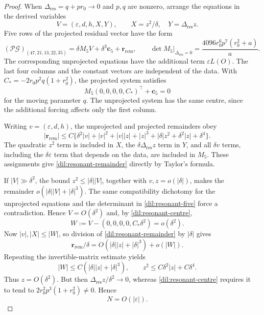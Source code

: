 \documentclass[11pt,a4paper]{article}
\numberwithin{equation}{section}
\theoremstyle{plain}
\theoremstyle{definition}
\theoremstyle{remark}
\begin{document}
\begin{proof}
When $\Delta_{\mathrm{res}}=q+pr_0\to0$ and $p,q$ are nonzero, arrange the equations in the derived variables
\[
 V=(\varepsilon,d,h,X,Y),\qquad
 X=z^2/\delta,\quad Y=\Delta_{\mathrm{res}} z.
\]
Five rows of the projected residual vector have the form
\begin{equation}\label{dil:resonant-five}
 (\mathcal P\boldsymbol{\mathcal G})_{(47,21,13,22,35)}=\delta M_5V+\delta^3\boldsymbol c_5+\boldsymbol r_{\mathrm{rem}},\qquad
 \det M_5\big|_{\Delta_{\mathrm{res}}=0}
      =\frac{4096r_0^6p^7(r_0^2+a)}a.
\end{equation}
The corresponding unprojected equations have the additional term
$\varepsilon L(O)$.  The last four columns and the constant vectors
are independent of the data.  With
$C_*=-2r_0p^2q(1+r_0^2)$, the projected system satisfies
\begin{equation}\label{dil:resonant-centre}
            M_5(0,0,0,0,C_*)^{\top}+\boldsymbol c_5=0
\end{equation}
for the moving parameter $q$. The unprojected system has the same centre, since the additional forcing affects only the first column.

Writing $v=(\varepsilon,d,h)$, the unprojected and projected remainders obey
\begin{equation}\label{dil:resonant-remainder}
 |\boldsymbol r_{\mathrm{rem}}|\le C\{
 \delta^2|v|+|v|^2+|v||z|+|z|^3+|\delta|z^2
                              +\delta^2|z|+\delta^4\}.
\end{equation}
The quadratic $z^2$ term is included in $X$, the $\delta\Delta_{\mathrm{res}} z$
term in $Y$, and all $\delta v$ terms, including the
$\delta\varepsilon$ term that depends on the data, are included in $M_5$.  These assignments
give \eqref{dil:resonant-remainder} directly by Taylor's formula.

If $|V|\gg\delta^2$, the bound $z^2\le|\delta||V|$, together with
$v,z=o(|\delta|)$, makes the remainder
$o(|\delta||V|+|\delta|^3)$. The same compatibility dichotomy for the unprojected equations
and the determinant in \eqref{dil:resonant-five} force a contradiction.
Hence $V=O(\delta^2)$ and, by \eqref{dil:resonant-centre},
\[
 W:=V-(0,0,0,0,C_*\delta^2)=o(\delta^2).
\]
Now $|v|,|X|\le|W|$, so division of
\eqref{dil:resonant-remainder} by $|\delta|$ gives
\[
 \boldsymbol r_{\mathrm{rem}}/\delta
       =O(|\delta||z|+|\delta|^3)+o(|W|).
\]
Repeating the invertible-matrix estimate yields
\[
 |W|\le C(|\delta||z|+|\delta|^3),\qquad
 z^2\le C\delta^2|z|+C\delta^4.
\]
Thus $z=O(\delta^2)$.  But then $\Delta_{\mathrm{res}} z/\delta^2\to0$, whereas
\eqref{dil:resonant-centre} requires it to tend to
$2r_0^2p^3(1+r_0^2)\ne0$.  Hence
\begin{equation}\label{dil:normal-rate}
                            N=O(|\varepsilon|).
\end{equation}


\end{proof}
\end{document}
